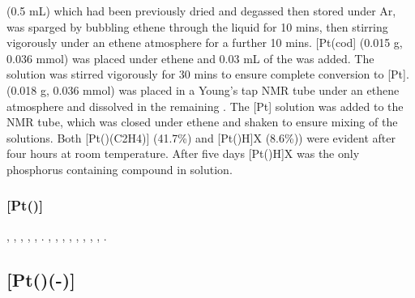 (0.5 mL) which had been previously dried and degassed then stored under Ar, was sparged by bubbling ethene through the liquid for 10 mins, then stirring vigorously under an ethene atmosphere for a further 10 mins.  [Pt(cod] (0.015 g, 0.036 mmol) was placed under ethene and 0.03 mL of the  was added.  The solution was stirred vigorously for 30 mins to ensure complete conversion to [Pt].  \tBuxantphos(0.018 g, 0.036 mmol) was placed in a Young's tap NMR tube under an ethene atmosphere and dissolved in the remaining .  The [Pt] solution was added to the NMR tube, which was closed under ethene and shaken to ensure mixing of the solutions.  Both [Pt(\tBuxantphos)\ce({C2H4})] (41.7\%) and [Pt(\tBuxantphos)H]X (8.6\%)) were evident after four hours at room temperature.  After five days [Pt(\tBuxantphos)H]X was the only phosphorus containing compound in solution.

\subsubsection*{[Pt(\tBuxantphos)]}

\begin{sloppypar}
,
,
,
,
,
.
,
,
,
,
,
,
,
,
.
\end{sloppypar}

\subsection*{\texorpdfstring{[Pt(\tButhixantphos)(-)]} P}


